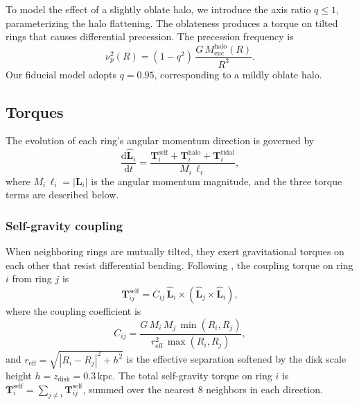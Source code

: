 To model the effect of a slightly oblate halo, we introduce the axis ratio $q \leq 1$, parameterizing the halo flattening. The oblateness produces a torque on tilted rings that causes differential precession. The precession frequency is
\begin{equation}
    \nu_p^2(R) = (1-q^2)\,\frac{G\,M_\mathrm{enc}^\mathrm{halo}(R)}{R^3}.
    \label{eq:nu_p}
\end{equation}
Our fiducial model adopts $q=0.95$, corresponding to a mildly oblate halo.

\subsection{Torques}
\label{sec:torques_method}

The evolution of each ring's angular momentum direction is governed by
\begin{equation}
    \frac{\mathrm{d}\hat{\boldsymbol{L}}_i}{\mathrm{d}t} = \frac{\boldsymbol{T}_i^\mathrm{self} + \boldsymbol{T}_i^\mathrm{halo} + \boldsymbol{T}_i^\mathrm{tidal}}{M_i\,\ell_i},
    \label{eq:dLdt}
\end{equation}
where $M_i\,\ell_i = |\boldsymbol{L}_i|$ is the angular momentum magnitude, and the three torque terms are described below.

\subsubsection{Self-gravity coupling}

When neighboring rings are mutually tilted, they exert gravitational torques on each other that resist differential bending. Following \citet{sparke1988}, the coupling torque on ring $i$ from ring $j$ is
\begin{equation}
    \boldsymbol{T}_{ij}^\mathrm{self} = C_{ij}\,\hat{\boldsymbol{L}}_i \times \left(\hat{\boldsymbol{L}}_j \times \hat{\boldsymbol{L}}_i\right),
\end{equation}
where the coupling coefficient is
\begin{equation}
    C_{ij} = \frac{G\,M_i\,M_j\,\min(R_i,R_j)}{r_\mathrm{eff}^2\,\max(R_i,R_j)},
\end{equation}
and $r_\mathrm{eff} = \sqrt{|R_i-R_j|^2 + h^2}$ is the effective separation softened by the disk scale height $h=z_\mathrm{disk}=0.3$\,kpc. The total self-gravity torque on ring $i$ is $\boldsymbol{T}_i^\mathrm{self}=\sum_{j\neq i} \boldsymbol{T}_{ij}^\mathrm{self}$, summed over the nearest 8 neighbors in each direction.

